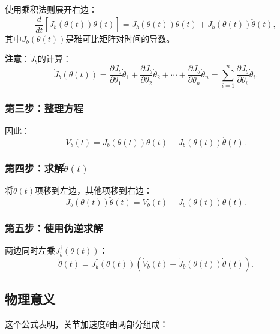 \documentclass{article}
\begin{document}
使用乘积法则展开右边：
\begin{equation}
\frac{d}{dt}[J_b(\theta(t))\dot{\theta}(t)] = \dot{J}_b(\theta(t))\dot{\theta}(t) + J_b(\theta(t))\ddot{\theta}(t),
\end{equation}
其中$\dot{J}_b(\theta(t))$是雅可比矩阵对时间的导数。

\textbf{注意}：$\dot{J}_b$的计算：
\begin{equation}
\dot{J}_b(\theta(t)) = \frac{\partial J_b}{\partial \theta_1}\dot{\theta}_1 + \frac{\partial J_b}{\partial \theta_2}\dot{\theta}_2 + \cdots + \frac{\partial J_b}{\partial \theta_n}\dot{\theta}_n = \sum_{i=1}^{n}\frac{\partial J_b}{\partial \theta_i}\dot{\theta}_i.
\end{equation}

\subsubsection{第三步：整理方程}

因此：
\begin{equation}
\dot{V}_b(t) = \dot{J}_b(\theta(t))\dot{\theta}(t) + J_b(\theta(t))\ddot{\theta}(t).
\end{equation}

\subsubsection{第四步：求解$\ddot{\theta}(t)$}

将$\ddot{\theta}(t)$项移到左边，其他项移到右边：
\begin{equation}
J_b(\theta(t))\ddot{\theta}(t) = \dot{V}_b(t) - \dot{J}_b(\theta(t))\dot{\theta}(t).
\end{equation}

\subsubsection{第五步：使用伪逆求解}

两边同时左乘$J_b^{\dagger}(\theta(t))$：
\begin{equation}
\ddot{\theta}(t) = J_b^{\dagger}(\theta(t))\left(\dot{V}_b(t) - \dot{J}_b(\theta(t))\dot{\theta}(t)\right). \tag{58}
\end{equation}

\subsection{物理意义}

这个公式表明，关节加速度$\ddot{\theta}$由两部分组成：
\end{document}
